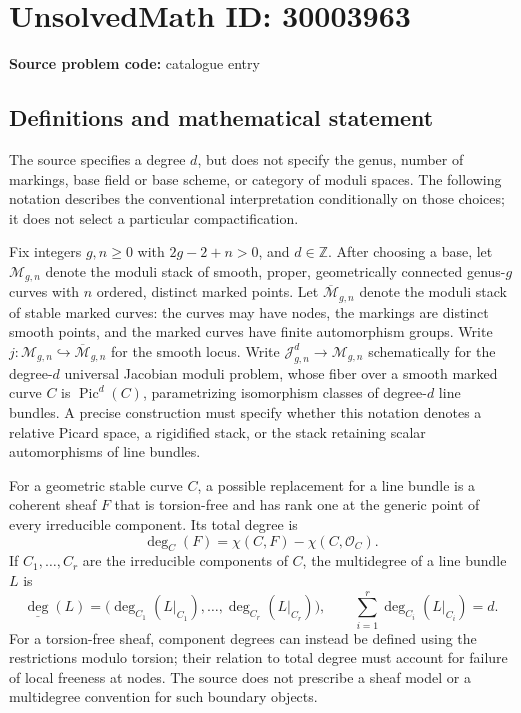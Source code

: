 \documentclass[11pt]{article}
\newcommand{\Z}{\mathbb{Z}}
\begin{document}
\section*{UnsolvedMath ID: 30003963}
\textbf{Source problem code:} catalogue entry
\subsection{Definitions and mathematical statement}
The source specifies a degree \(d\), but does not specify the genus, number of markings, base field or base scheme, or category of moduli spaces. The following notation describes the conventional interpretation conditionally on those choices; it does not select a particular compactification.

Fix integers \(g,n\geq 0\) with \(2g-2+n>0\), and \(d\in\Z\). After choosing a base, let \(\mathcal M_{g,n}\) denote the moduli stack of smooth, proper, geometrically connected genus-\(g\) curves with \(n\) ordered, distinct marked points. Let \(\overline{\mathcal M}_{g,n}\) denote the moduli stack of stable marked curves: the curves may have nodes, the markings are distinct smooth points, and the marked curves have finite automorphism groups. Write \(j:\mathcal M_{g,n}\hookrightarrow\overline{\mathcal M}_{g,n}\) for the smooth locus. Write \(\mathcal J^d_{g,n}\to\mathcal M_{g,n}\) schematically for the degree-\(d\) universal Jacobian moduli problem, whose fiber over a smooth marked curve \(C\) is \(\operatorname{Pic}^d(C)\), parametrizing isomorphism classes of degree-\(d\) line bundles. A precise construction must specify whether this notation denotes a relative Picard space, a rigidified stack, or the stack retaining scalar automorphisms of line bundles.

For a geometric stable curve \(C\), a possible replacement for a line bundle is a coherent sheaf \(F\) that is torsion-free and has rank one at the generic point of every irreducible component. Its total degree is
\[
\deg_C(F)=\chi(C,F)-\chi(C,\mathcal O_C).
\]
If \(C_1,\ldots,C_r\) are the irreducible components of \(C\), the multidegree of a line bundle \(L\) is
\[
\underline{\deg}(L)=\bigl(\deg_{C_1}(L|_{C_1}),\ldots,\deg_{C_r}(L|_{C_r})\bigr),\qquad
\sum_{i=1}^{r}\deg_{C_i}(L|_{C_i})=d.
\]
For a torsion-free sheaf, component degrees can instead be defined using the restrictions modulo torsion; their relation to total degree must account for failure of local freeness at nodes. The source does not prescribe a sheaf model or a multidegree convention for such boundary objects.
\end{document}
